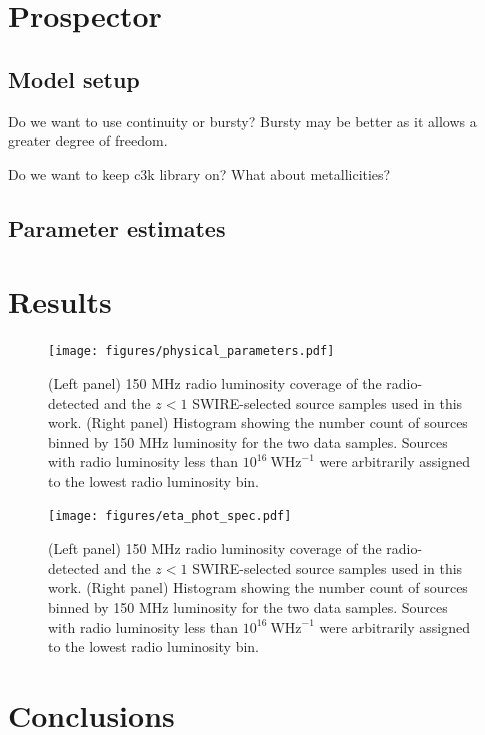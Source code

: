 \documentclass[fleqn,usenatbib]{mnras}
\begin{document}
\section{Prospector}
\subsection{Model setup}
Do we want to use continuity or bursty? Bursty may be better as it allows a greater degree of freedom.

Do we want to keep c3k library on? What about metallicities? 

\subsection{Parameter estimates}

\section{Results}
\begin{figure}
  {\texttt{[image: figures/physical\_parameters.pdf]}}
    \caption{(Left panel) 150 MHz radio luminosity coverage of the radio-detected and the $z < 1$ SWIRE-selected source samples used in this work. (Right panel) Histogram showing the number count of sources binned by 150 MHz luminosity for the two data samples. Sources with radio luminosity less than $10^{16}~\mathrm{WHz}^{-1}$ were arbitrarily assigned to the lowest radio luminosity bin.}
    \label{fig:physical_parameters}
\end{figure}

\begin{figure}
  {\texttt{[image: figures/eta\_phot\_spec.pdf]}}
    \caption{(Left panel) 150 MHz radio luminosity coverage of the radio-detected and the $z < 1$ SWIRE-selected source samples used in this work. (Right panel) Histogram showing the number count of sources binned by 150 MHz luminosity for the two data samples. Sources with radio luminosity less than $10^{16}~\mathrm{WHz}^{-1}$ were arbitrarily assigned to the lowest radio luminosity bin.}
    \label{fig:eta_phot_spec}
\end{figure}


\section{Conclusions}
\end{document}
